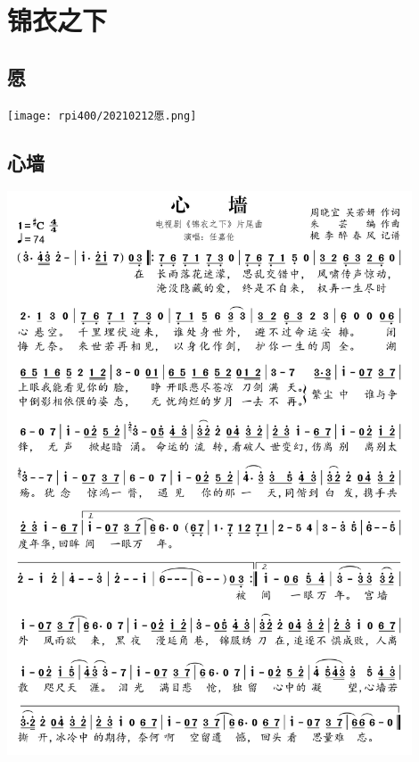 \documentclass[cn,pad,twocol]{elegantbook}
\begin{document}
\chapter{锦衣之下}
\section{愿} \texttt{[image: rpi400/20210212愿.png]}
\section{心墙} \includegraphics[width=0.9\textwidth]{rpi400/20210212心墙.png}
\end{document}
